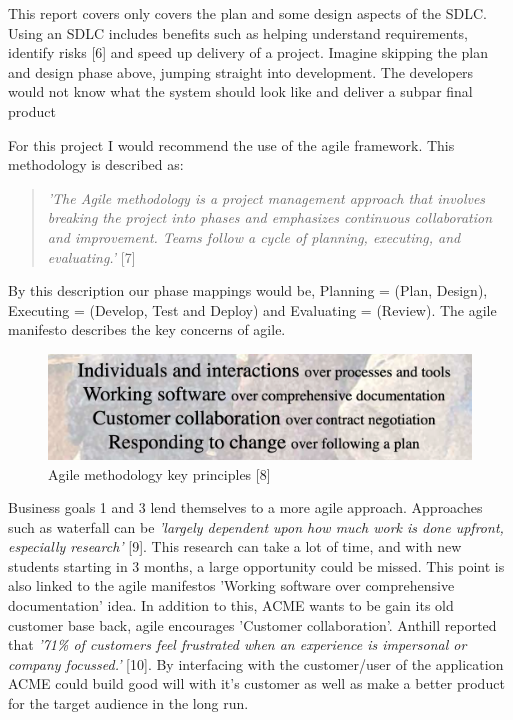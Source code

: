   This report covers only covers the plan and some design aspects of the SDLC. Using an SDLC includes benefits such as helping understand requirements,
  identify risks [6] and speed up delivery of a project. Imagine skipping the plan and design phase above, jumping straight into development. The developers
  would not know what the system should look like and deliver a subpar final product

  For this project I would recommend the use of the agile framework. This methodology is described as:
  \begin{quote}
    \textit{'The Agile methodology is a project management approach that involves breaking the project into phases and emphasizes continuous collaboration and 
    improvement. Teams follow a cycle of planning, executing, and evaluating.'} [7]
  \end{quote}

  By this description our phase mappings would be, Planning = (Plan, Design), Executing = (Develop, Test and Deploy) and Evaluating = (Review). The agile manifesto
  describes the key concerns of agile.

  \begin{figure}[H]
    \centering
    \includegraphics[width=12cm]{assets/agileManifesto.png}
    \caption{Agile methodology key principles [8]}
    \label{fig:agileManifesto}
  \end{figure}

  Business goals 1 and 3 lend themselves to a more agile approach. Approaches such as waterfall can be \textit{'largely dependent upon how much work is done 
  upfront, especially research'} [9]. This research can take a lot of time, and with new students starting in 3 months, a large opportunity could be missed.
  This point is also linked to the agile manifestos 'Working software over comprehensive documentation' idea. In addition to this, ACME wants to be gain its
  old customer base back, agile encourages 'Customer collaboration'. Anthill reported that  \textit{'71\% of customers feel frustrated when an experience is 
  impersonal or company focussed.'} [10]. By interfacing with the customer/user of the application ACME could build good will with it's customer as well as 
  make a better product for the target audience in the long run.
\newpage